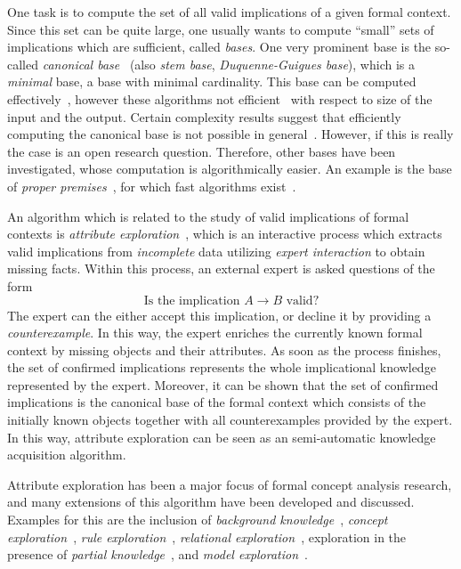 One task is to compute the set of all valid implications of a given formal context.  Since
this set can be quite large, one usually wants to compute \enquote{small} sets of
implications which are sufficient, called \emph{bases}.  One very prominent base is the
so-called \emph{canonical base}~\cite{fca:DuquenneGuigues:1986} (also \emph{stem base},
\emph{Duquenne-Guigues base}), which is a \emph{minimal} base, \ie a base with minimal
cardinality.  This base can be computed
effectively~\cite{DBLP:conf/icfca/Ganter10,DBLP:journals/amai/ObiedkovD07}, however these
algorithms not efficient~\cite{DBLP:conf/icfca/Distel10} with respect to size of the input
and the output.  Certain complexity results suggest that efficiently computing the
canonical base is not possible in general~\cite{DBLP:journals/dam/BabinK13}.  However, if
this is really the case is an open research question.  Therefore, other bases have been
investigated, whose computation is algorithmically easier.  An example is the base of
\emph{proper premises}~\cite{fca-book}, for which fast algorithms
exist~\cite{RyDiBo-AMAI13}.

An algorithm which is related to the study of valid implications of formal contexts is
\emph{attribute exploration}~\cite{fca-book,GORS-book}, which is an interactive process
which extracts valid implications from \emph{incomplete} data utilizing \emph{expert
  interaction} to obtain missing facts.  Within this process, an external expert is asked
questions of the form
\begin{equation*}
  \text{Is the implication } A \to B \text{ valid?}
\end{equation*}
The expert can the either accept this implication, or decline it by providing a
\emph{counterexample}.  In this way, the expert enriches the currently known formal
context by missing objects and their attributes.  As soon as the process finishes, the set
of confirmed implications represents the whole implicational knowledge represented by the
expert.  Moreover, it can be shown that the set of confirmed implications is the canonical
base of the formal context which consists of the initially known objects together with all
counterexamples provided by the expert.  In this way, attribute exploration can be seen as
an semi-automatic knowledge acquisition algorithm.

Attribute exploration has been a major focus of formal concept analysis research, and many
extensions of this algorithm have been developed and discussed.  Examples for this are the
inclusion of \emph{background
  knowledge}~\cite{stumme96attribute,DBLP:journals/tcs/Ganter99}, \emph{concept
  exploration}~\cite{conf/iccs/Stumme97}, \emph{rule
  exploration}~\cite{phd/de/Zickwolff1991}, \emph{relational
  exploration}~\cite{phd/de/Rudolph2006}, exploration in the presence of \emph{partial
  knowledge}~\cite{book/fca/BurmeisterH05,conf/ijcai/BaaderGSS07}, and \emph{model
  exploration}~\cite{Diss-Felix}.

